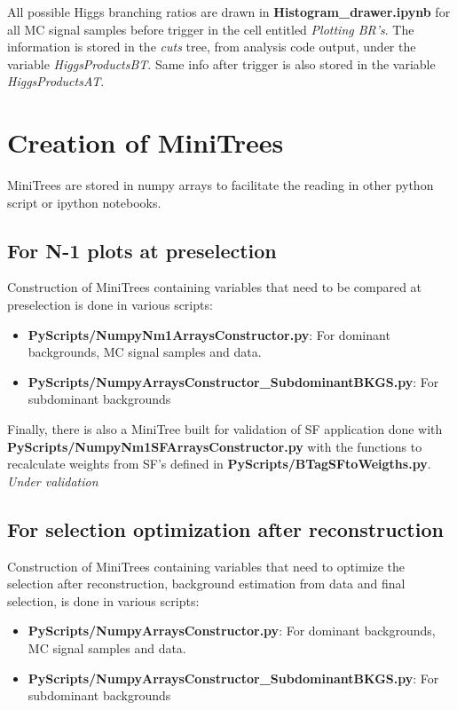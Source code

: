 \documentclass[11pt,a4paper]{article}
\begin{document}
All possible Higgs branching ratios are drawn in \textbf{Histogram\_drawer.ipynb} for all MC signal samples before trigger in the cell entitled \textit{Plotting BR's}. The information is stored in the \textit{cuts} tree, from analysis code output, under the variable \textit{HiggsProductsBT}. Same info after trigger is also stored in the variable \textit{HiggsProductsAT}.

\section{Creation of MiniTrees}

MiniTrees are stored in numpy arrays to facilitate the reading in other python script or ipython notebooks.

\subsection{For N-1 plots at preselection}
\label{nm1minitrees}

Construction of MiniTrees containing variables that need to be compared at preselection is done in various scripts:
\begin{itemize}
\item \textbf{PyScripts/NumpyNm1ArraysConstructor.py}: For dominant backgrounds, MC signal samples and data.
\item \textbf{PyScripts/NumpyArraysConstructor\_SubdominantBKGS.py}: For subdominant backgrounds
\end{itemize}
Finally, there is also a MiniTree built for validation of SF application done with \textbf{PyScripts/NumpyNm1SFArraysConstructor.py} with the functions to recalculate weights from SF's defined in \textbf{PyScripts/BTagSFtoWeigths.py}. \textit{Under validation}

\subsection{For selection optimization after reconstruction}
\label{selminitrees}

Construction of MiniTrees containing variables that need to optimize the selection after reconstruction, background estimation from data and final selection, is done in various scripts:
\begin{itemize}
\item \textbf{PyScripts/NumpyArraysConstructor.py}: For dominant backgrounds, MC signal samples and data.
\item \textbf{PyScripts/NumpyArraysConstructor\_SubdominantBKGS.py}: For subdominant backgrounds
\end{itemize}
\end{document}
